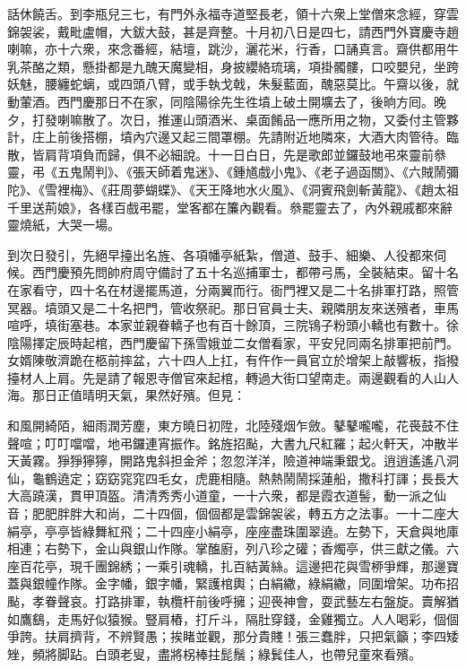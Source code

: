 話休饒舌。到李瓶兒三七，有門外永福寺道堅長老，領十六衆上堂僧來念經，穿雲錦袈裟，戴毗盧帽，大鈸大鼓，甚是齊整。{}十月初八日是四七，請西門外寶慶寺趙喇嘛，亦十六衆，來念番經，結壇，跳沙，灑花米，行香，口誦真言。齋供都用牛乳茶酪之類，懸掛都是九醜天魔變相，身披纓絡琉璃，項掛髑髏，口咬嬰兒，坐跨妖魅，腰纏蛇螭，或四頭八臂，或手執戈戟，朱髮藍面，醜惡莫比。午齋以後，就動葷酒。西門慶那日不在家，同陰陽徐先生徃墳上破土開壙去了，後晌方囘。晚夕，打發喇嘛散了。次日，推運山頭酒米、桌面餚品一應所用之物，又委付主管夥計，庄上前後搭棚，墳內穴邊又起三間罩棚。先請附近地隣來，大酒大肉管待。臨散，皆肩背項負而歸，{}俱不必細說。十一日白日，先是歌郎並鑼鼓地弔來靈前叅靈，弔《五鬼鬧判》、《張天師着鬼迷》、《鍾馗戲小鬼》、《老子過函關》、《六賊鬧彌陀》、《雪裡梅》、《莊周夢蝴蝶》、《天王降地水火風》、《洞賓飛劍斬黃龍》、《趙太祖千里送荊娘》，各樣百戲弔罷，堂客都在簾內觀看。叅罷靈去了，內外親戚都來辭靈燒紙，大哭一場。

到次日發引，先絕早擡出名旌、各項幡亭紙紮，僧道、鼓手、細樂、人役都來伺候。西門慶預先問帥府周守備討了五十名巡捕軍士，都帶弓馬，全裝結束。留十名在家看守，四十名在材邊擺馬道，分兩翼而行。衙門裡又是二十名排軍打路，照管冥器。墳頭又是二十名把門，管收祭祀。那日官員士夫、親隣朋友來送殯者，車馬喧呼，填街塞巷。本家並親眷轎子也有百十餘頂，三院鴇子粉頭小轎也有數十。徐陰陽擇定辰時起棺，西門慶留下孫雪娥並二女僧看家，平安兒同兩名排軍把前門。女婿陳敬濟跪在柩前摔盆，{}六十四人上扛，有仵作一員官立於增架上敲響板，指撥擡材人上肩。先是請了報恩寺僧官來起棺，轉過大街口望南走。兩邊觀看的人山人海。那日正值晴明天氣，果然好殯。但見：

和風開綺陌，細雨潤芳塵，東方曉日初陞，北陸殘烟乍斂。鼕鼕嚨嚨，花䘮鼓不住聲喧；叮叮噹噹，地弔鑼連宵振作。銘旌招颭，大書九尺紅羅；起火軒天，冲散半天黃霧。猙猙獰獰，開路鬼斜担金斧；忽忽洋洋，險道神端秉銀戈。逍逍遙遙八洞仙，龜鶴遶定；窈窈窕窕四毛女，虎鹿相隨。熱熱鬧鬧採蓮船，撒科打諢；長長大大高蹺漢，貫甲頂盔。清清秀秀小道童，一十六衆，都是霞衣道髻，動一派之仙音；肥肥胖胖大和尚，二十四個，個個都是雲錦袈裟，轉五方之法事。一十二座大絹亭，亭亭皆綠舞紅飛；二十四座小絹亭，座座盡珠圍翠遶。左勢下，天倉與地庫相連；右勢下，金山與銀山作隊。掌醢廚，列八珍之礶；香燭亭，供三獻之儀。六座百花亭，現千團錦綉；一乘引魂轎，扎百結黃絲。這邊把花與雪桺爭輝，那邊寶蓋與銀幢作隊。金字幡，銀字幡，緊護棺輿；白絹繖，綠絹繖，同圍增架。功布招颭，孝眷聲哀。打路排軍，執欖杆前後呼擁；迎䘮神會，耍武藝左右盤旋。賣解猶如鷹鷂，走馬好似猿猴。豎肩樁，打斤斗，隔肚穿錢，金雞獨立。人人喝彩，個個爭誇。扶肩擠背，不辨賢愚；挨睹並觀，那分貴賤！張三蠢胖，只把氣籲；李四矮矬，頻將脚跕。白頭老叟，盡將柺棒拄髭鬚；綠鬂佳人，也帶兒童來看殯。

